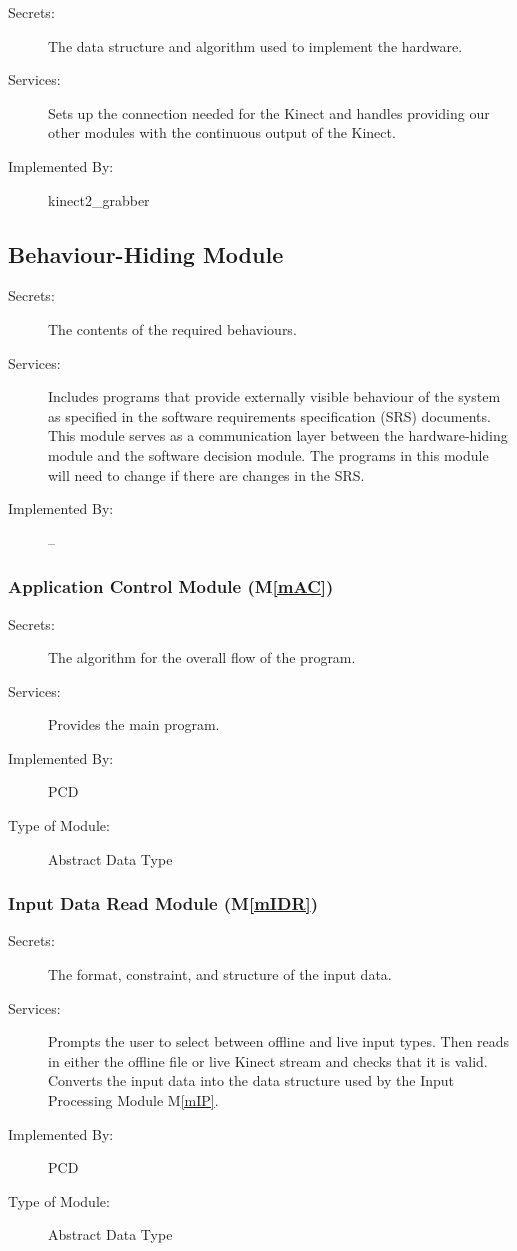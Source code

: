 \documentclass[12pt, titlepage]{article}
\newcommand{\mref}[1]{M\ref{#1}}
\begin{document}
\begin{description}
\item[Secrets:]The data structure and algorithm used to implement the hardware.
\item[Services:]Sets up the connection needed for the Kinect and handles providing
  our other modules with the continuous output of the Kinect.
\item[Implemented By:] kinect2\_grabber
\end{description}

\subsection{Behaviour-Hiding Module}

\begin{description}
\item[Secrets:]The contents of the required behaviours.
\item[Services:]Includes programs that provide externally visible behaviour of
  the system as specified in the software requirements specification (SRS)
  documents. This module serves as a communication layer between the
  hardware-hiding module and the software decision module. The programs in this
  module will need to change if there are changes in the SRS.
\item[Implemented By:] --
\end{description}

\subsubsection{Application Control Module (\mref{mAC})}

\begin{description}
\item[Secrets:]The algorithm for the overall flow of the program.
\item[Services:]Provides the main program.
\item[Implemented By:]PCD
\item[Type of Module:]Abstract Data Type
\end{description}

\subsubsection{Input Data Read Module (\mref{mIDR})}

\begin{description}
\item[Secrets:]The format, constraint, and structure of the input data.
\item[Services:]Prompts the user to select between offline and live input types. Then reads 
  in either the offline file or live Kinect stream and checks that it is valid.
  Converts the input data into the data structure used by the Input Processing Module \mref{mIP}.
\item[Implemented By:]PCD
\item[Type of Module:]Abstract Data Type
\end{description}
\end{document}
